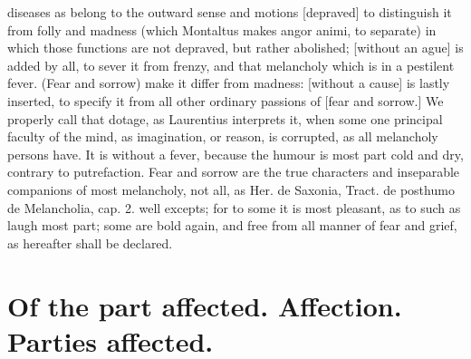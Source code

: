 {diseases as belong to the outward sense and motions [depraved] to
distinguish it from folly and madness (which Montaltus makes angor
animi, to separate) in which those functions are not depraved, but
rather abolished; [without an ague] is added by all, to sever it from
frenzy, and that melancholy which is in a pestilent fever. (Fear and
sorrow) make it differ from madness: [without a cause] is lastly
inserted, to specify it from all other ordinary passions of [fear and
sorrow.] We properly call that dotage, as Laurentius interprets
it, when some one principal faculty of the mind, as imagination, or
reason, is corrupted, as all melancholy persons have. It is without a
fever, because the humour is most part cold and dry, contrary to
putrefaction. Fear and sorrow are the true characters and inseparable
companions of most melancholy, not all, as Her. de Saxonia, Tract. de
posthumo de Melancholia, cap. 2. well excepts; for to some it is most
pleasant, as to such as laugh most part; some are bold again, and free
from all manner of fear and grief, as hereafter shall be declared.

\section{Of the part affected. Affection. Parties affected.}

}
